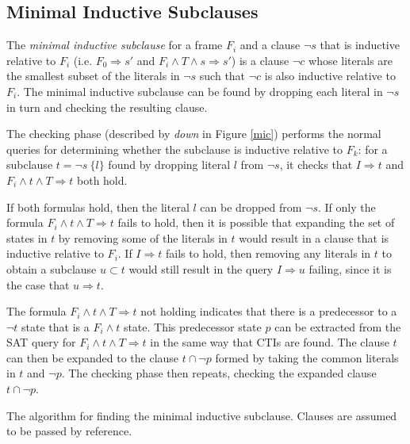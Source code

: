 \documentclass[12pt,a4paper,twoside,openright]{report}
\begin{document}
{\subsection{Minimal Inductive Subclauses}
The \emph{minimal inductive subclause} for a frame $F_i$ and a clause $\neg s$ that
is inductive relative to $F_i$
(i.e. $F_0 \Rightarrow s'$ and $F_i \wedge T \wedge s \Rightarrow s'$)
is a clause $\neg c$ whose
literals are the smallest subset of the literals in $\neg s$ such that
$\neg c$ is also inductive relative to $F_i$.
The minimal inductive subclause can be found by dropping each literal
in $\neg s$ in turn and checking the resulting clause.

The checking phase (described by {\it down} in Figure \ref{mic})
performs the normal queries
for determining whether the subclause is inductive relative to
$F_k$: for a subclause $t = \neg s \ \{l\}$ found by dropping
literal $l$ from $\neg s$, it checks that
$I \Rightarrow t$ and $F_i \wedge t \wedge T \Rightarrow t$ both hold.

If both formulas hold, then the literal $l$ can be dropped from $\neg s$.
If only the formula $F_i \wedge t \wedge T \Rightarrow t$ fails to hold, then
it is possible that expanding the set of states in $t$ by removing some of the
literals in $t$ would result in a clause that is inductive relative to $F_i$.
If $I \Rightarrow t$ fails to hold, then removing any literals in $t$ to
obtain a subclause $u \subset t$ would still result in the query $I \Rightarrow u$
failing, since it is the case that $u \Rightarrow t$.

The formula $F_i \wedge t \wedge T \Rightarrow t$ not holding indicates
that there is a predecessor to a $\neg t$ state that is a $F_i \wedge t$ state.
This predecessor state $p$ can be extracted from the SAT query for
$F_i \wedge t \wedge T \Rightarrow t$ in the same way that CTIs are found.
The clause $t$ can then be expanded to the clause $t \cap \neg p$
formed by taking the common literals in $t$ and $\neg p$.
The checking phase then repeats, checking the expanded clause $t \cap \neg p$.

\begin{algorithm}[t]
\DontPrintSemicolon
{}
\caption{The algorithm for finding the minimal inductive subclause. Clauses are assumed
to be passed by reference.}
\label{mic}
\end{algorithm}

}
\end{document}
